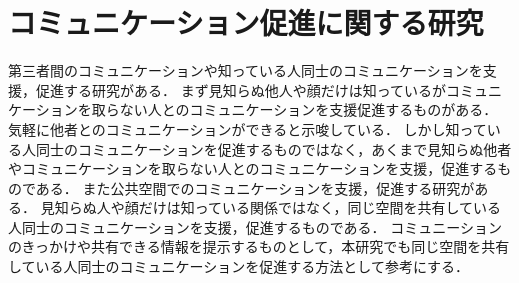 \section{コミュニケーション促進に関する研究}\label{2.4}
第三者間のコミュニケーションや知っている人同士のコミュニケーションを支援，促進する研究がある．
まず見知らぬ他人や顔だけは知っているがコミュニケーションを取らない人とのコミュニケーションを支援促進するものがある\cite{hati}\cite{tikachat}\cite{compresence}\cite{siruetto}．
気軽に他者とのコミュニケーションができると示唆している．
しかし知っている人同士のコミュニケーションを促進するものではなく，あくまで見知らぬ他者やコミュニケーションを取らない人とのコミュニケーションを支援，促進するものである．
また公共空間でのコミュニケーションを支援，促進する研究がある\cite{komyusoku}\cite{travelingcafe}\cite{meetingpot}\cite{photochat}．
見知らぬ人や顔だけは知っている関係ではなく，同じ空間を共有している人同士のコミュニケーションを支援，促進するものである．
コミュニーションのきっかけや共有できる情報を提示するものとして，本研究でも同じ空間を共有している人同士のコミュニケーションを促進する方法として参考にする．




